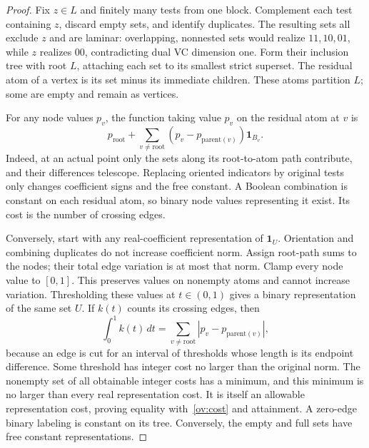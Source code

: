 \begin{proof}
Fix $z\in L$ and finitely many tests from one block. Complement each test containing $z$, discard empty sets, and identify duplicates. The resulting sets all exclude $z$ and are laminar: overlapping, nonnested sets would realize $11,10,01$, while $z$ realizes $00$, contradicting dual VC dimension one. Form their inclusion tree with root $L$, attaching each set to its smallest strict superset. The residual atom of a vertex is its set minus its immediate children. These atoms partition $L$; some are empty and remain as vertices.

For any node values $p_v$, the function taking value $p_v$ on the residual atom at $v$ is
\begin{equation}\label{ov:telescoping}
 p_{\mathrm{root}}+
 \sum_{v\ne\mathrm{root}}(p_v-p_{\mathrm{parent}(v)})\mathbf1_{B_v}.
\end{equation}
Indeed, at an actual point only the sets along its root-to-atom path contribute, and their differences telescope. Replacing oriented indicators by original tests only changes coefficient signs and the free constant. A Boolean combination is constant on each residual atom, so binary node values representing it exist. Its cost is the number of crossing edges.

Conversely, start with any real-coefficient representation of $\mathbf1_U$. Orientation and combining duplicates do not increase coefficient norm. Assign root-path sums to the nodes; their total edge variation is at most that norm. Clamp every node value to $[0,1]$. This preserves values on nonempty atoms and cannot increase variation. Thresholding these values at $t\in(0,1)$ gives a binary representation of the same set $U$. If $k(t)$ counts its crossing edges, then
\[
 \int_0^1 k(t)\,dt
 =\sum_{v\ne\mathrm{root}}|p_v-p_{\mathrm{parent}(v)}|,
\]
because an edge is cut for an interval of thresholds whose length is its endpoint difference. Some threshold has integer cost no larger than the original norm. The nonempty set of all obtainable integer costs has a minimum, and this minimum is no larger than every real representation cost. It is itself an allowable representation cost, proving equality with~\eqref{ov:cost} and attainment. A zero-edge binary labeling is constant on its tree. Conversely, the empty and full sets have free constant representations.
\end{proof}

